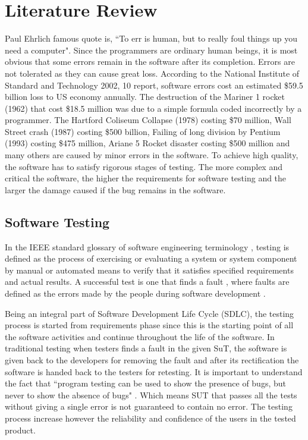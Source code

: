 \chapter{Literature Review}




Paul Ehrlich famous quote is, ``To err is human, but to really foul things up you need a computer". Since the programmers are ordinary human beings, it is most obvious that some errors remain in the software after its completion. Errors are not tolerated as they can cause great loss. According to the National Institute of Standard and Technology 2002, 10 report, software errors cost an estimated \$59.5 billion loss to US economy annually. The destruction of the Mariner 1 rocket (1962) that cost \$18.5 million was due to a simple formula coded incorrectly by a programmer. The Hartford Coliseum Collapse (1978) costing \$70 million, Wall Street crash (1987) costing \$500 billion, Failing of long division by Pentium (1993) costing \$475 million, Ariane 5 Rocket disaster costing \$500 million and many others are caused by minor errors in the software. To achieve high quality, the software has to satisfy rigorous stages of testing. The more complex and critical the software, the higher the requirements for software testing and the larger the damage caused if the bug remains in the software. 

\section{Software Testing}
In the IEEE standard glossary of software engineering terminology \cite{american1984}, testing is defined as the process of exercising or evaluating a system or system component by manual or automated means to verify that it satisfies specified requirements and actual results. A successful test is one that finds a fault \cite{Myers2004}, where faults are defined as the errors made by the people during software development \cite{american1984}.

Being an integral part of Software Development Life Cycle (SDLC), the testing process is started from requirements phase since this is the starting point of all the software activities and continue throughout the life of the software. In traditional testing when testers finds a fault in the given SuT, the software is given back to the developers for removing the fault and after its rectification the software is handed back to the testers for retesting. It is important to understand the fact that ``program testing can be used to show the presence of bugs, but never to show the absence of bugs" \cite{Dijkstra1972}. Which means SUT that passes all the tests without giving a single error is not guaranteed to contain no error. The testing process increase however the reliability and confidence of the users in the tested product.


